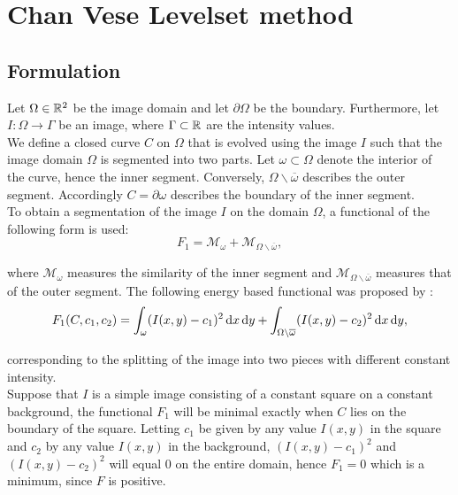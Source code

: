 
\chapter{Chan Vese Levelset method}\label{chapter:CVL}
\section{Formulation}
Let $\Omega\in \mathbb R^2$ be the image domain and let $\partial\Omega$ be the boundary. Furthermore, let $I:\Omega\to \Gamma$ be an image, where $\Gamma\subset\mathbb R$ are the intensity values.\\
We define a closed curve $C$ on $\Omega$ that is evolved using the image $I$ such that the image domain $\Omega$ is segmented into two parts. Let $\omega\subset\Omega$ denote the interior of the curve, hence the inner segment. Conversely, $\Omega\backslash\overline{\omega}$ describes the outer segment. Accordingly $C=\partial\omega$ describes the boundary of the inner segment.\\
To obtain a segmentation of the image $I$ on the domain $\Omega$, a functional of the following form is used:
\begin{equation}
  F_1 = \mathcal{M}_{\omega} + \mathcal{M}_{\Omega\backslash\overline{\omega}},
\end{equation}

where $\mathcal{M}_{\omega}$ measures the similarity of the inner segment and $\mathcal{M}_{\Omega\backslash\overline{\omega}}$ measures that of the outer segment. The following energy based functional was proposed by \cite{chan.01}:
\begin{equation}
  F_1(C,c_1,c_2) = \int_{\omega} (I(x,y)-c_1)^2 \df x \df y + \int_{\Omega\backslash\overline{\omega}} (I(x,y)-c_2)^2 \df x \df y,\label{F0}
\end{equation} 

corresponding to the splitting of the image into two pieces with different constant intensity.\\
Suppose that $I$ is a simple image consisting of a constant square on a constant background, the functional $F_1$ will be minimal exactly when $C$ lies on the boundary of the square. Letting $c_1$ be given by any value  $I(x,y)$ in the square and $c_2$ by any value $I(x,y)$ in the background, $(I(x,y)-c_1)^2$ and $(I(x,y)-c_2)^2$ will equal 0 on the entire domain, hence $F_1=0$ which is a minimum, since $F$ is positive.\\

